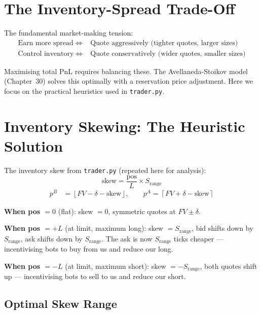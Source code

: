 \documentclass[12pt,a4paper,openany]{report}
\theoremstyle{definition}
\newcommand{\floor}[1]{\left\lfloor#1\right\rfloor}
\newcommand{\ceil}[1]{\left\lceil#1\right\rceil}
\begin{document}
\section{The Inventory-Spread Trade-Off}

The fundamental market-making tension:
\begin{align}
  \text{Earn more spread} \;\Leftrightarrow\; &\text{Quote aggressively (tighter quotes, larger sizes)} \\
  \text{Control inventory} \;\Leftrightarrow\; &\text{Quote conservatively (wider quotes, smaller sizes)}
\end{align}

Maximising total PnL requires balancing these. The Avellaneda-Stoikov model (Chapter~30) solves this optimally with a reservation price adjustment. Here we focus on the practical heuristics used in \texttt{trader.py}.

\section{Inventory Skewing: The Heuristic Solution}

The inventory skew from \texttt{trader.py} (repeated here for analysis):
\begin{equation}
  \text{skew} = \frac{\text{pos}}{L} \times S_{\text{range}}
\end{equation}
\begin{align}
  p^B &= \floor{FV - \delta - \text{skew}}, \qquad p^A = \ceil{FV + \delta - \text{skew}}
\end{align}

\textbf{When pos $= 0$} (flat): skew $= 0$, symmetric quotes at $FV \pm \delta$.

\textbf{When pos $= +L$} (at limit, maximum long): skew $= S_{\text{range}}$, bid shifts down by $S_{\text{range}}$, ask shifts down by $S_{\text{range}}$. The ask is now $S_{\text{range}}$ ticks cheaper — incentivising bots to buy from us and reduce our long.

\textbf{When pos $= -L$} (at limit, maximum short): skew $= -S_{\text{range}}$, both quotes shift up — incentivising bots to sell to us and reduce our short.

\subsection{Optimal Skew Range}
\end{document}
